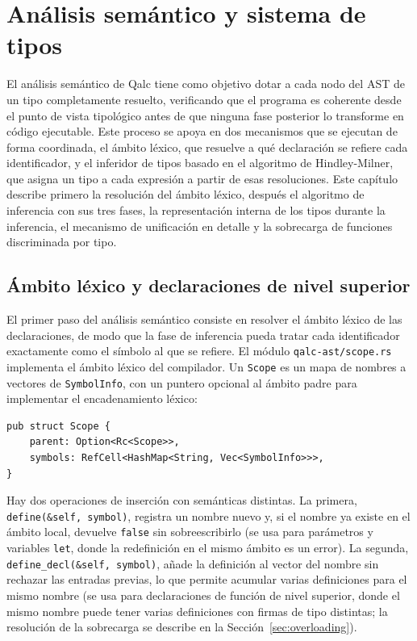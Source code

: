 \chapter{Análisis semántico y sistema de tipos}
\label{ch:analisis-semantico}

El análisis semántico de Qalc tiene como objetivo dotar a cada nodo del AST de un tipo completamente resuelto, verificando que el programa es coherente desde el punto de vista tipológico antes de que ninguna fase posterior lo transforme en código ejecutable. Este proceso se apoya en dos mecanismos que se ejecutan de forma coordinada, el ámbito léxico, que resuelve a qué declaración se refiere cada identificador, y el inferidor de tipos basado en el algoritmo de Hindley-Milner, que asigna un tipo a cada expresión a partir de esas resoluciones. Este capítulo describe primero la resolución del ámbito léxico, después el algoritmo de inferencia con sus tres fases, la representación interna de los tipos durante la inferencia, el mecanismo de unificación en detalle y la sobrecarga de funciones discriminada por tipo.

\section{Ámbito léxico y declaraciones de nivel superior}
\label{sec:ambito-lexico}

El primer paso del análisis semántico consiste en resolver el ámbito léxico de las declaraciones, de modo que la fase de inferencia pueda tratar cada identificador exactamente como el símbolo al que se refiere. El módulo \lstinline|qalc-ast/scope.rs| implementa el ámbito léxico del compilador. Un \lstinline|Scope| es un mapa de nombres a vectores de \lstinline|SymbolInfo|, con un puntero opcional al ámbito padre para implementar el encadenamiento léxico:

\begin{lstlisting}[language={}, caption=Definición del tipo Scope para el ámbito léxico]
pub struct Scope {
    parent: Option<Rc<Scope>>,
    symbols: RefCell<HashMap<String, Vec<SymbolInfo>>>,
}
\end{lstlisting}

Hay dos operaciones de inserción con semánticas distintas. La primera, \lstinline|define(&self, symbol)|, registra un nombre nuevo y, si el nombre ya existe en el ámbito local, devuelve \lstinline|false| sin sobreescribirlo (se usa para parámetros y variables \lstinline|let|, donde la redefinición en el mismo ámbito es un error). La segunda, \lstinline|define_decl(&self, symbol)|, añade la definición al vector del nombre sin rechazar las entradas previas, lo que permite acumular varias definiciones para el mismo nombre (se usa para declaraciones de función de nivel superior, donde el mismo nombre puede tener varias definiciones con firmas de tipo distintas; la resolución de la sobrecarga se describe en la Sección~\ref{sec:overloading}).

